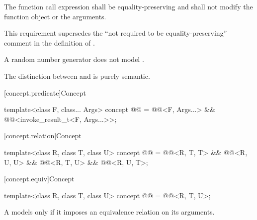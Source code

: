 \begin{itemdescr}
\pnum
The  function call expression shall be
equality-preserving and
shall not modify the function object or the arguments.
\begin{note}
This requirement supersedes the ``not required to be equality-preserving'' comment
in the definition of .
\end{note}

\pnum
\begin{example}
A random number generator does not model .
\end{example}

\pnum
\begin{note}
The distinction between  and 
is purely semantic.
\end{note}
\end{itemdescr}

[concept.predicate]{Concept }

\begin{itemdecl}
template<class F, class... Args>
  concept @@ =
    @@<F, Args...> && @@<invoke_result_t<F, Args...>>;
\end{itemdecl}

[concept.relation]{Concept }

\begin{itemdecl}
template<class R, class T, class U>
  concept @@ =
    @@<R, T, T> && @@<R, U, U> &&
    @@<R, T, U> && @@<R, U, T>;
\end{itemdecl}

[concept.equiv]{Concept }

\begin{itemdecl}
template<class R, class T, class U>
  concept @@ = @@<R, T, U>;
\end{itemdecl}

\begin{itemdescr}
\pnum
A  models  only if
it imposes an equivalence relation on its arguments.
\end{itemdescr}

